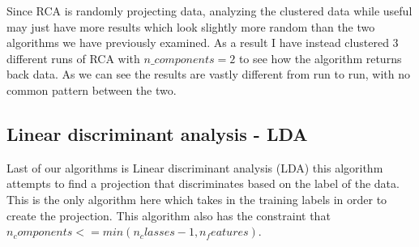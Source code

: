 \documentclass[
letterpaper, %
]{IEEEtran}
\begin{document}
	Since RCA is randomly projecting data, analyzing the clustered data while useful may just have more results which look slightly more random than the two algorithms we have previously examined. As a result I have instead clustered 3 different runs of RCA with $n\_components=2$ to see how the algorithm returns back data. As we can see the results are vastly different from run to run, with no common pattern between the two.

	
	\subsection{Linear discriminant analysis - LDA}
	Last of our algorithms is Linear discriminant analysis (LDA) this algorithm attempts to find a projection that discriminates based on the label of the data. This is the only algorithm here which takes in the training labels in order to create the projection. This algorithm also has the constraint that $n_components<= min(n_classes - 1, n_features)$.
\end{document}
